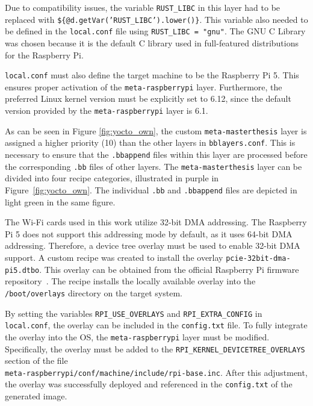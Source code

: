 Due to compatibility issues, the variable \texttt{RUST\_LIBC} in this layer had to be replaced with \texttt{\$\{@d.getVar('RUST\_LIBC').lower()\}}.  
This variable also needed to be defined in the \texttt{local.conf} file using \texttt{RUST\_LIBC = "gnu"}.  
The GNU C Library was chosen because it is the default C library used in full-featured distributions for the Raspberry Pi.

\texttt{local.conf} must also define the target machine to be the Raspberry Pi 5.  
This ensures proper activation of the \texttt{meta-raspberrypi} layer.  
Furthermore, the preferred Linux kernel version must be explicitly set to 6.12, since the default version provided by the \texttt{meta-raspberrypi} layer is 6.1.  

As can be seen in Figure \ref{fig:yocto_own}, the custom \texttt{meta-masterthesis} layer is assigned a higher priority (10) than the other layers in \texttt{bblayers.conf}.  
This is necessary to ensure that the \texttt{.bbappend} files within this layer are processed before the corresponding \texttt{.bb} files of other layers.  
The \texttt{meta-masterthesis} layer can be divided into four recipe categories, illustrated in purple in Figure~\ref{fig:yocto_own}.  
The individual \texttt{.bb} and \texttt{.bbappend} files are depicted in light green in the same figure.

The Wi-Fi cards used in this work utilize 32-bit DMA addressing.  
The Raspberry Pi 5 does not support this addressing mode by default, as it uses 64-bit DMA addressing.  
Therefore, a device tree overlay must be used to enable 32-bit DMA support.  
A custom recipe was created to install the overlay \texttt{pcie-32bit-dma-pi5.dtbo}.  
This overlay can be obtained from the official Raspberry Pi firmware repository~\cite{overlay}.  
The recipe installs the locally available overlay into the \texttt{/boot/overlays} directory on the target system.  

By setting the variables \texttt{RPI\_USE\_OVERLAYS} and \texttt{RPI\_EXTRA\_CONFIG} in \texttt{local.conf}, the overlay can be included in the \texttt{config.txt} file.  
To fully integrate the overlay into the \ac{OS}, the \texttt{meta-raspberrypi} layer must be modified.  
Specifically, the overlay must be added to the \texttt{RPI\_KERNEL\_DEVICETREE\_OVERLAYS} section of the file \\
\texttt{meta-raspberrypi/conf/machine/include/rpi-base.inc}.  
After this adjustment, the overlay was successfully deployed and referenced in the \texttt{config.txt} of the generated image.

